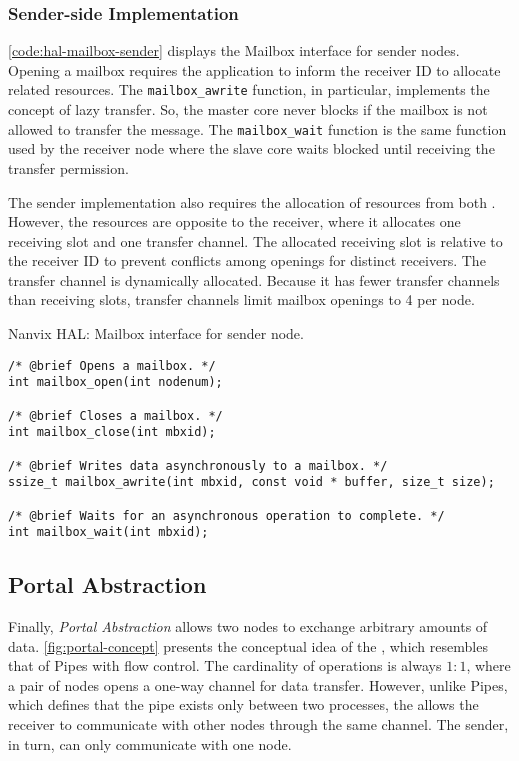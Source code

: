 			\subsubsection{Sender-side Implementation}

				\autoref{code:hal-mailbox-sender} displays the Mailbox interface for
				sender nodes. Opening a mailbox requires the application to inform
				the receiver ID to allocate related resources. The \texttt{mailbox\_awrite} function,
				in particular, implements the concept of lazy transfer. So, the master
				core never blocks if the mailbox is not allowed to transfer the message.
				The \texttt{mailbox\_wait} function is the same function used by the receiver node where
				the slave core waits blocked until receiving the transfer permission.

				The sender implementation also requires the allocation of resources
				from both \nocs. However, the resources are opposite to the receiver,
				where it allocates one \cnoc receiving slot and one \dnoc transfer channel.
				The allocated \cnoc receiving slot is relative to the receiver ID to
				prevent conflicts among openings for distinct receivers. The transfer
				channel is dynamically allocated. Because it has fewer transfer channels
				than receiving slots, transfer channels limit mailbox openings to 4 per node.

\begin{listing}[!tb]
\caption{Nanvix HAL: Mailbox interface for sender node.}
\label{code:hal-mailbox-sender}
\begin{verbatim}
/* @brief Opens a mailbox. */
int mailbox_open(int nodenum);

/* @brief Closes a mailbox. */
int mailbox_close(int mbxid);

/* @brief Writes data asynchronously to a mailbox. */
ssize_t mailbox_awrite(int mbxid, const void * buffer, size_t size);

/* @brief Waits for an asynchronous operation to complete. */
int mailbox_wait(int mbxid);
\end{verbatim}
\end{listing}

		\subsection{Portal Abstraction}
		\label{sec.portal-abs}

			Finally, \textit{Portal Abstraction} allows two nodes to exchange arbitrary
			amounts of data. \autoref{fig:portal-concept} presents the conceptual idea
			of the \portal, which resembles that of \posix Pipes with flow control.
			The cardinality of operations is always $1:1$, where a pair of nodes opens
			a one-way channel for data transfer. However, unlike \posix Pipes, which
			defines that the pipe exists only between two processes, the \portal allows
			the receiver to communicate with other nodes through the same channel.
			The sender, in turn, can only communicate with one node.


